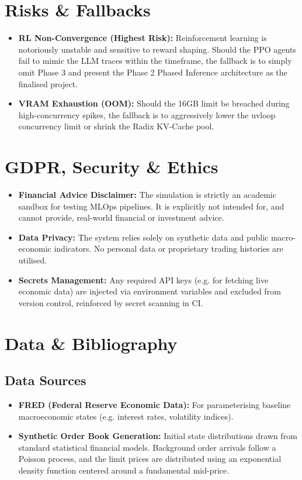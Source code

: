 \documentclass[10pt,a4paper]{article}
\begin{document}
\section{Risks \& Fallbacks}

\begin{itemize}
    \item \textbf{RL Non-Convergence (Highest Risk):} Reinforcement learning is notoriously unstable and sensitive to reward shaping. Should the PPO agents fail to mimic the LLM traces within the timeframe, the fallback is to simply omit Phase 3 and present the Phase 2 Phased Inference architecture as the finalised project.
    \item \textbf{VRAM Exhaustion (OOM):} Should the 16GB limit be breached during high-concurrency spikes, the fallback is to aggressively lower the uvloop concurrency limit or shrink the Radix KV-Cache pool.
\end{itemize}

\section{GDPR, Security \& Ethics}

\begin{itemize}
    \item \textbf{Financial Advice Disclaimer:} The simulation is strictly an academic sandbox for testing MLOps pipelines. It is explicitly not intended for, and cannot provide, real-world financial or investment advice.
    \item \textbf{Data Privacy:} The system relies solely on synthetic data and public macro-economic indicators. No personal data or proprietary trading histories are utilised.
    \item \textbf{Secrets Management:} Any required API keys (e.g. for fetching live economic data) are injected via environment variables and excluded from version control, reinforced by secret scanning in CI.
\end{itemize}

\section{Data \& Bibliography}

\subsection*{Data Sources}
\begin{itemize}
    \item \textbf{FRED (Federal Reserve Economic Data):} For parameterising baseline macroeconomic states (e.g. interest rates, volatility indices).
    \item \textbf{Synthetic Order Book Generation:} Initial state distributions drawn from standard statistical financial models. Background order arrivals follow a Poisson process, and the limit prices are distributed using an exponential density function centered around a fundamental mid-price.
\end{itemize}
\end{document}

